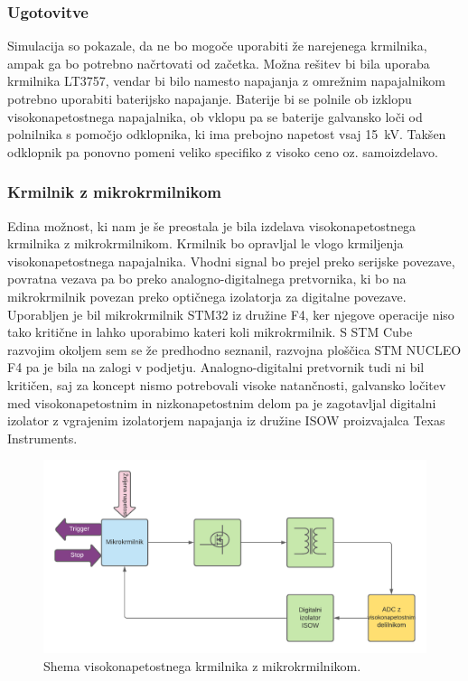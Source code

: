 \documentclass[a4paper,twoside,openright,12pt,Slovene]{book}
\begin{document}
    \subsubsection{Ugotovitve} \label{Ugotovitve glede komercialnih krmilnkov}
Simulacija so pokazale, da ne bo mogoče uporabiti že narejenega krmilnika, ampak ga bo potrebno načrtovati od začetka. Možna rešitev bi bila uporaba krmilnika LT3757, vendar bi bilo namesto napajanja z omrežnim napajalnikom potrebno uporabiti baterijsko napajanje. Baterije bi se polnile ob izklopu visokonapetostnega napajalnika, ob vklopu pa se baterije galvansko loči od polnilnika s pomočjo odklopnika,  ki ima prebojno napetost vsaj \SI{15}{\kilo\volt}. Takšen odklopnik pa ponovno pomeni veliko specifiko z visoko ceno oz. samoizdelavo. 

	\subsubsection{Krmilnik z mikrokrmilnikom} \label{KrmilnikzUc}
Edina možnost, ki nam je še preostala je bila izdelava visokonapetostnega krmilnika z mikrokrmilnikom. Krmilnik bo opravljal le vlogo krmiljenja visokonapetostnega napajalnika. Vhodni signal bo prejel preko serijske povezave, povratna vezava pa bo preko analogno-digitalnega pretvornika, ki bo na mikrokrmilnik povezan preko optičnega izolatorja za digitalne povezave. Uporabljen je bil mikrokrmilnik STM32 iz družine F4, ker njegove operacije niso tako kritične in lahko uporabimo kateri koli mikrokrmilnik. S STM Cube razvojim okoljem sem se že predhodno seznanil, razvojna ploščica STM NUCLEO F4 pa je bila na zalogi v podjetju. Analogno-digitalni pretvornik tudi ni bil kritičen, saj za koncept nismo potrebovali visoke natančnosti, galvansko ločitev med visokonapetostnim in nizkonapetostnim delom pa je zagotavljal digitalni izolator z vgrajenim izolatorjem napajanja iz družine ISOW proizvajalca Texas Instruments. 

	\begin{figure}[H]
    \centering
    \includegraphics[width=1\columnwidth]{Sheme/KrmilnikzuCElShema.pdf}
    \caption{\label{KrmilnikzuCElShema} Shema visokonapetostnega krmilnika z mikrokrmilnikom.}
	\end{figure}
\end{document}
